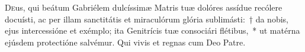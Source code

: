 \documentclass[vesperale_romanum.tex]{subfiles}
\begin{document}

\quadcommferiae

\myrule


\duplex

\oratio
\lettrine{D}{e}us, qui beátum Gabriélem dulcíssimæ Matris tuæ dolóres assídue recólere docuísti, ac per illam san\-ctitátis et miraculórum glória sublimásti:~† da nobis, ejus intercessióne et exémplo; ita Genitrícis tuæ consociári flétibus,~* ut matérna ejúsdem prote\-ctióne salvémur.
Qui vivis et regnas cum Deo Patre.

\quadcommferiae
\end{document}
